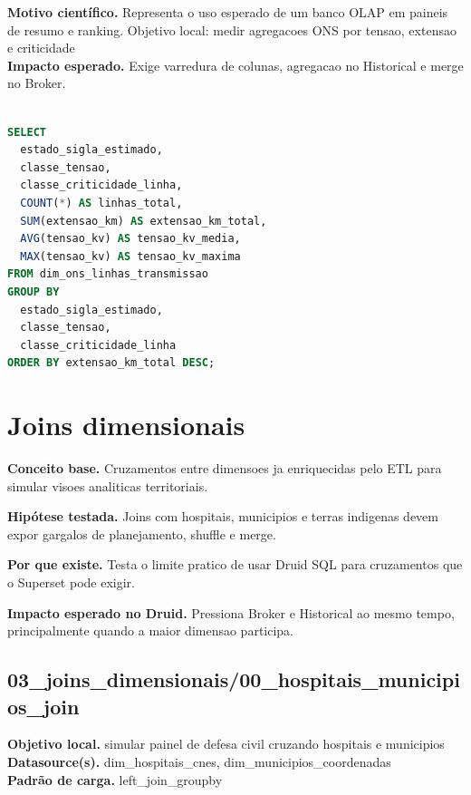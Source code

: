 \documentclass[11pt,a4paper]{article}
\begin{document}
\textbf{Motivo científico.} Representa o uso esperado de um banco OLAP em paineis de resumo e ranking. Objetivo local: medir agregacoes ONS por tensao, extensao e criticidade\\

\textbf{Impacto esperado.} Exige varredura de colunas, agregacao no Historical e merge no Broker.

\begin{lstlisting}[language=SQL]

SELECT
  estado_sigla_estimado,
  classe_tensao,
  classe_criticidade_linha,
  COUNT(*) AS linhas_total,
  SUM(extensao_km) AS extensao_km_total,
  AVG(tensao_kv) AS tensao_kv_media,
  MAX(tensao_kv) AS tensao_kv_maxima
FROM dim_ons_linhas_transmissao
GROUP BY
  estado_sigla_estimado,
  classe_tensao,
  classe_criticidade_linha
ORDER BY extensao_km_total DESC;

\end{lstlisting}

\clearpage

\section{Joins dimensionais}

\textbf{Conceito base.} Cruzamentos entre dimensoes ja enriquecidas pelo ETL para simular visoes analiticas territoriais.

\textbf{Hipótese testada.} Joins com hospitais, municipios e terras indigenas devem expor gargalos de planejamento, shuffle e merge.

\textbf{Por que existe.} Testa o limite pratico de usar Druid SQL para cruzamentos que o Superset pode exigir.

\textbf{Impacto esperado no Druid.} Pressiona Broker e Historical ao mesmo tempo, principalmente quando a maior dimensao participa.

\subsection{03\_joins\_dimensionais/00\_hospitais\_municipios\_join}

\textbf{Objetivo local.} simular painel de defesa civil cruzando hospitais e municipios\\

\textbf{Datasource(s).} dim\_hospitais\_cnes, dim\_municipios\_coordenadas\\

\textbf{Padrão de carga.} left\_join\_groupby\\
\end{document}
